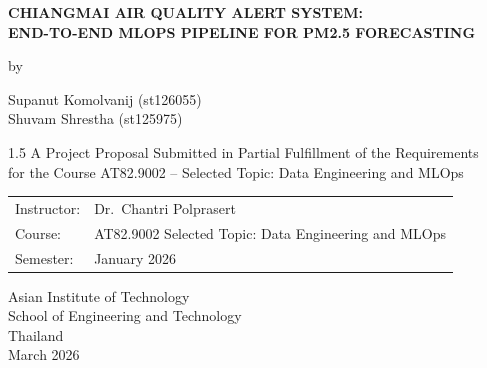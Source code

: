 \documentclass[12pt,a4paper]{report}
\begin{document}


\begin{titlepage}
\begin{center}
\vspace*{1.5cm}

{\large\bfseries CHIANGMAI AIR QUALITY ALERT SYSTEM: \\[0.4em]
END-TO-END MLOPS PIPELINE FOR PM2.5 FORECASTING}

\vspace{2.5cm}

by

\vspace{1.2cm}

{\normalsize
Supanut Komolvanij (st126055) \\[0.4em]
Shuvam Shrestha (st125975)
}

\vspace{2.2cm}

\begin{spacing}{1.5}
{\normalsize
A Project Proposal Submitted in Partial Fulfillment of the Requirements \\
for the Course AT82.9002 -- Selected Topic: Data Engineering and MLOps
}
\end{spacing}

\vspace{1.5cm}

\begin{tabular}{ll}
  Instructor:   & Dr.\ Chantri Polprasert \\[0.4em]
  Course:       & AT82.9002 Selected Topic: Data Engineering and MLOps \\[0.4em]
  Semester:     & January 2026 \\
\end{tabular}

\vfill

Asian Institute of Technology \\
School of Engineering and Technology \\
Thailand \\[0.4em]
March 2026

\end{center}
\end{titlepage}
\end{document}
